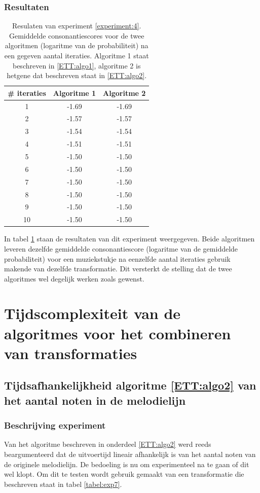 \subsubsection{Resultaten}
\begin{table}
  \centering
  \begin{tabular}{c | c | c }    
    \# iteraties & Algoritme 1 & Algoritme 2 \\
    \hline
    1 & -1.69 & -1.69\\
    2 & -1.57 & -1.57\\
    3 & -1.54 & -1.54\\
    4 & -1.51 & -1.51\\
    5 & -1.50 & -1.50\\
    6 & -1.50 & -1.50\\
    7 & -1.50 & -1.50\\
    8 & -1.50 & -1.50\\
    9 & -1.50 & -1.50\\
    10 & -1.50 & -1.50\\
  \end{tabular}
  \caption{Resulaten van experiment \ref{experiment:4}. Gemiddelde consonantiescores voor de twee algoritmen (logaritme van de probabiliteit) na een gegeven aantal iteraties. Algoritme 1 staat beschreven in \ref{ETT:algo1}, algoritme 2 is hetgene dat beschreven staat in \ref{ETT:algo2}.}
  \label{tabel:res4}
\end{table}

In tabel \ref{tabel:res4} staan de resultaten van dit experiment weergegeven. Beide algoritmen leveren dezelfde gemiddelde consonantiescore (logaritme van de gemiddelde probabiliteit) voor een muziekstukje na eenzelfde aantal iteraties gebruik makende van dezelfde transformatie. Dit versterkt de stelling dat de twee algoritmes wel degelijk werken zoals gewenst.

\section{Tijdscomplexiteit van de algoritmes voor het combineren van transformaties}
\subsection{Tijdsafhankelijkheid algoritme \ref{ETT:algo2} van het aantal noten in de melodielijn}
\label{experiment:7}
\subsubsection{Beschrijving experiment}
Van het algoritme beschreven in onderdeel \ref{ETT:algo2} werd reeds beargumenteerd dat de uitvoertijd lineair afhankelijk is van het aantal noten van de originele melodielijn. De bedoeling is nu om experimenteel na te gaan of dit wel klopt. Om dit te testen wordt gebruik gemaakt van een transformatie die beschreven staat in tabel \ref{tabel:exp7}.

